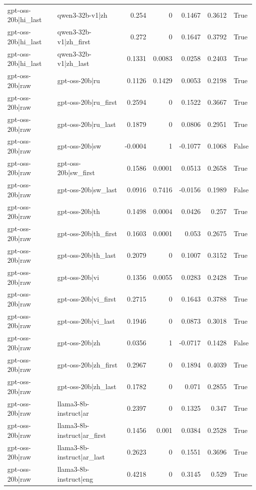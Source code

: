 \begin{table}
\begin{tabular}{l l r r r r l}
gpt-oss-20b|hi_last & qwen3-32b-v1|zh & 0.254 & 0 & 0.1467 & 0.3612 & True \\
gpt-oss-20b|hi_last & qwen3-32b-v1|zh_first & 0.272 & 0 & 0.1647 & 0.3792 & True \\
gpt-oss-20b|hi_last & qwen3-32b-v1|zh_last & 0.1331 & 0.0083 & 0.0258 & 0.2403 & True \\
gpt-oss-20b|raw & gpt-oss-20b|ru & 0.1126 & 0.1429 & 0.0053 & 0.2198 & True \\
gpt-oss-20b|raw & gpt-oss-20b|ru_first & 0.2594 & 0 & 0.1522 & 0.3667 & True \\
gpt-oss-20b|raw & gpt-oss-20b|ru_last & 0.1879 & 0 & 0.0806 & 0.2951 & True \\
gpt-oss-20b|raw & gpt-oss-20b|sw & -0.0004 & 1 & -0.1077 & 0.1068 & False \\
gpt-oss-20b|raw & gpt-oss-20b|sw_first & 0.1586 & 0.0001 & 0.0513 & 0.2658 & True \\
gpt-oss-20b|raw & gpt-oss-20b|sw_last & 0.0916 & 0.7416 & -0.0156 & 0.1989 & False \\
gpt-oss-20b|raw & gpt-oss-20b|th & 0.1498 & 0.0004 & 0.0426 & 0.257 & True \\
gpt-oss-20b|raw & gpt-oss-20b|th_first & 0.1603 & 0.0001 & 0.053 & 0.2675 & True \\
gpt-oss-20b|raw & gpt-oss-20b|th_last & 0.2079 & 0 & 0.1007 & 0.3152 & True \\
gpt-oss-20b|raw & gpt-oss-20b|vi & 0.1356 & 0.0055 & 0.0283 & 0.2428 & True \\
gpt-oss-20b|raw & gpt-oss-20b|vi_first & 0.2715 & 0 & 0.1643 & 0.3788 & True \\
gpt-oss-20b|raw & gpt-oss-20b|vi_last & 0.1946 & 0 & 0.0873 & 0.3018 & True \\
gpt-oss-20b|raw & gpt-oss-20b|zh & 0.0356 & 1 & -0.0717 & 0.1428 & False \\
gpt-oss-20b|raw & gpt-oss-20b|zh_first & 0.2967 & 0 & 0.1894 & 0.4039 & True \\
gpt-oss-20b|raw & gpt-oss-20b|zh_last & 0.1782 & 0 & 0.071 & 0.2855 & True \\
gpt-oss-20b|raw & llama3-8b-instruct|ar & 0.2397 & 0 & 0.1325 & 0.347 & True \\
gpt-oss-20b|raw & llama3-8b-instruct|ar_first & 0.1456 & 0.001 & 0.0384 & 0.2528 & True \\
gpt-oss-20b|raw & llama3-8b-instruct|ar_last & 0.2623 & 0 & 0.1551 & 0.3696 & True \\
gpt-oss-20b|raw & llama3-8b-instruct|eng & 0.4218 & 0 & 0.3145 & 0.529 & True \\

\end{tabular}
\end{table}
